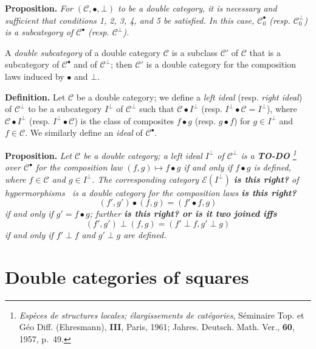\documentclass{article}
\newenvironment{itenv}[1]
  {\phantomsection\par\medskip\noindent\textbf{#1.}\itshape}
  {\par\medskip}
\newenvironment{rmenv}[1]
  {\phantomsection\par\medskip\noindent\textbf{#1.}\rmfamily}
  {\par\medskip}
\newcommand{\oldpage}[1]{\marginpar{\footnotesize$\Big\vert$ \textit{p.~#1}}}
\newcommand{\todo}{{\color{purple}\textbf{TO-DO }}}
\newcommand{\unsure}[1]{{\color{purple}\textbf{#1}}}
\newcommand{\CC}{\mathcal{C}}
\newcommand{\dotc}{{\mathbin{\bullet}}}
\newcommand{\botc}{{\mathbin{\bot}}}
\begin{document}
\begin{itenv}{Proposition}
  For $(\CC,\dotc,\botc)$ to be a double category, it is necessary and sufficient that conditions 1, 2, 3\textquotesingle, 4\textquotesingle, and 5 be satisfied.
  In this case, $\CC_0^\dotc$ (resp. $\CC_0^\botc$) is a subcategory of $\CC^\dotc$ (resp. $\CC^\botc$).
\end{itenv}

A \emph{double subcategory} of a double category $\CC$ is a subclass $\CC'$ of $\CC$ that is a subcategory of $\CC^\dotc$ and of $\CC^\botc$;
then $\CC'$ is a double category for the composition laws induced by $\dotc$ and $\botc$.

\begin{rmenv}{Definition}
  Let $\CC$ be a double category;
  we define a \emph{left ideal} (resp. \emph{right ideal}) of $\CC^\botc$ to be a subcategory $I^\botc$ of $\CC^\botc$ such that $\CC\dotc I^\botc$ (resp. $I^\botc\dotc\CC=I^\botc$), where $\CC\dotc I^\botc$ (resp. $I^\botc\dotc\CC$) is the class of composites $f\dotc g$ (resp. $g\dotc f$) for $g\in I^\botc$ and $f\in\CC$.
  We similarly define an \emph{ideal} of $\CC^\dotc$.
\end{rmenv}

\oldpage{2}

\begin{itenv}{Proposition}
  Let $\CC$ be a double category;
  a left ideal $I^\botc$ of $\CC^\botc$ is a \todo\footnote{\label{fn1}\emph{Espèces de structures locales; élargissements de catégories}, Séminaire Top. et Géo Diff. (Ehresmann), \textbf{III}, Paris, 1961; Jahres. Deutsch. Math. Ver., \textbf{60}, 1957, p.~49.} over $\CC^\dotc$ for the composition law $(f,g)\mapsto f\dotc g$ if and only if $f\dotc g$ is defined, where $f\in\CC$ and $g\in I^\botc$.
  The corresponding category $\mathcal{E}(I^\botc)$ \unsure{is this right?} of hypermorphisms~ is a double category for the composition laws \unsure{is this right?}
  \[
    (f',g')\dotc(f,g)
    = (f'\dotc f,g)
  \]
  if and only if $g'=f\dotc g$; further \unsure{is this right? or is it two joined iffs}
  \[
    (f',g')\botc(f,g)
    = (f'\botc f,g'\botc g)
  \]
  if and only if $f'\botc f$ and $g'\botc g$ are defined.
\end{itenv}


\section{Double categories of squares}
\end{document}
